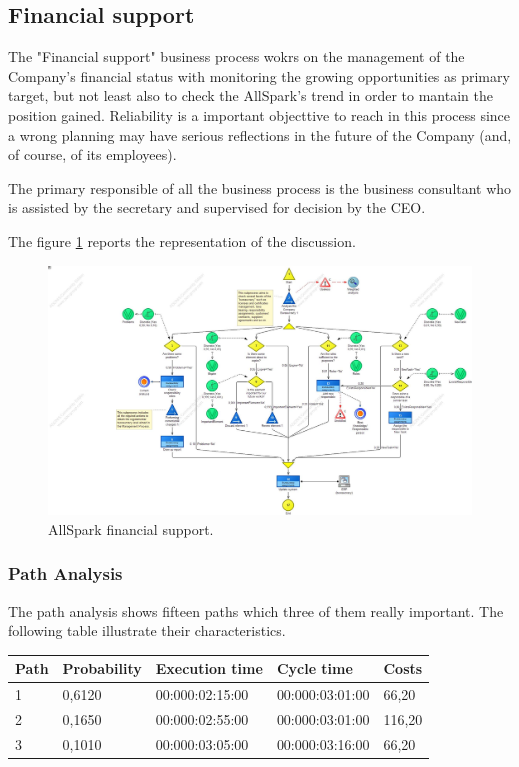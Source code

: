 \subsection{Financial support}
The "Financial support" business process wokrs on the management of the Company's financial status with monitoring the growing opportunities as primary target, but not least also to check the AllSpark's trend in order to mantain the position gained. Reliability is a important objecttive to reach in this process since a wrong planning may have serious reflections in the future of the Company (and, of course, of its employees).

The primary responsible of all the business process is the business consultant who is assisted by the secretary and supervised for decision by the CEO.

The figure \ref{2img:financial_sup} reports the representation of the discussion.\\

\begin{figure}[ht!]
\begin{centering}
\includegraphics[scale=0.35, angle=90]{assign2/adonis/imgs/financial_sup.jpg}
\caption{AllSpark financial support.}
\label{2img:financial_sup}
\end{centering}
\end{figure}


\subsubsection{Path Analysis}
The path analysis shows fifteen paths which three of them really important. The following table illustrate their characteristics.\\

\begin{table}
\centering
\begin{tabular}{|l|l|l|l|l|}
Path&Probability&Execution time&Cycle time&Costs\\
\hline
1&0,6120&00:000:02:15:00&00:000:03:01:00&66,20\\
\hline
2&0,1650&00:000:02:55:00&00:000:03:01:00&116,20\\
\hline
3&0,1010&00:000:03:05:00&00:000:03:16:00&66,20
\end{tabular}
\end{table}

